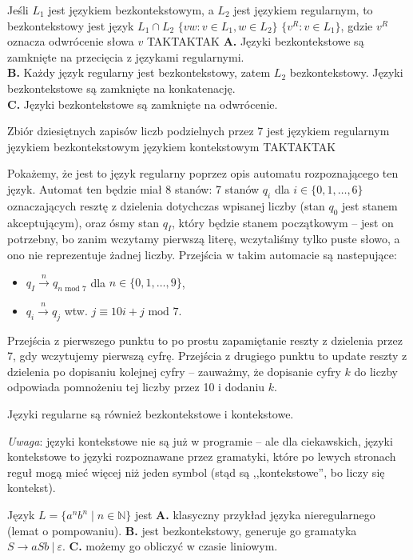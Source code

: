 \begin{solutions}
    \sol Jeśli $L_1$ jest językiem bezkontekstowym, a $L_2$ jest językiem regularnym, to bezkontekstowy jest język
    \answerss
    {$L_1 \cap L_2$}
    {$\{vw : v \in L_1, w \in L_2\}$}
    {$\{v^R : v \in L_1\}$, gdzie $v^R$ oznacza odwrócenie słowa $v$}
    {TAK}{TAK}{TAK}
    \textbf{A.} Języki bezkontekstowe są zamknięte na przecięcia z językami regularnymi. \\
    \textbf{B.} Każdy język regularny jest bezkontekstowy, zatem $L_2$ bezkontekstowy. Języki bezkontekstowe są zamknięte na konkatenację. \\
    \textbf{C.} Języki bezkontekstowe są zamknięte na odwrócenie.

    \sol Zbiór dziesiętnych zapisów liczb podzielnych przez 7 jest
    \answerss
    {językiem regularnym}
    {językiem bezkontekstowym}
    {językiem kontekstowym}
    {TAK}{TAK}{TAK}

    Pokażemy, że jest to język regularny poprzez opis automatu rozpoznającego ten język. Automat ten będzie miał 8 stanów: 7 stanów $q_i$ dla $i \in \{ 0, 1, \ldots, 6 \}$ oznaczających resztę z dzielenia dotychczas wpisanej liczby (stan $q_0$ jest stanem akceptującym), oraz ósmy stan $q_I$, który będzie stanem początkowym -- jest on potrzebny, bo zanim wczytamy pierwszą literę, wczytaliśmy tylko puste słowo, a ono nie reprezentuje żadnej liczby. Przejścia w takim automacie są nastepujące:
    \begin{itemize}
    \item $q_I \xrightarrow{n} q_{n \text{ mod } 7}$ dla $n \in \{ 0, 1, \ldots, 9 \}$,
    \item $q_i \xrightarrow{n} q_j$ wtw. $j \equiv 10i + j \text{ mod } 7$.
    \end{itemize}
    Przejścia z pierwszego punktu to po prostu zapamiętanie reszty z dzielenia przez 7, gdy wczytujemy pierwszą cyfrę. Przejścia z drugiego punktu to update reszty z dzielenia po dopisaniu kolejnej cyfry -- zauważmy, że dopisanie cyfry $k$ do liczby odpowiada pomnożeniu tej liczby przez 10 i dodaniu $k$.

    Języki regularne są również bezkontekstowe i kontekstowe. 
    
    \textit{Uwaga}: języki kontekstowe nie są już w programie -- ale dla ciekawskich, języki kontekstowe to języki rozpoznawane przez gramatyki, które po lewych stronach reguł mogą mieć więcej niż jeden symbol (stąd są ,,kontekstowe'', bo liczy się kontekst).

    \sol Język $L = \{a^nb^n \mid n \in \mathbb{N}\}$ jest
    \textbf{A.} klasyczny przykład języka nieregularnego (lemat o pompowaniu). \textbf{B.} jest bezkontekstowy, generuje go gramatyka $S \to aSb \ | \ \varepsilon$. \textbf{C.} możemy go obliczyć w czasie liniowym.


\end{solutions}

